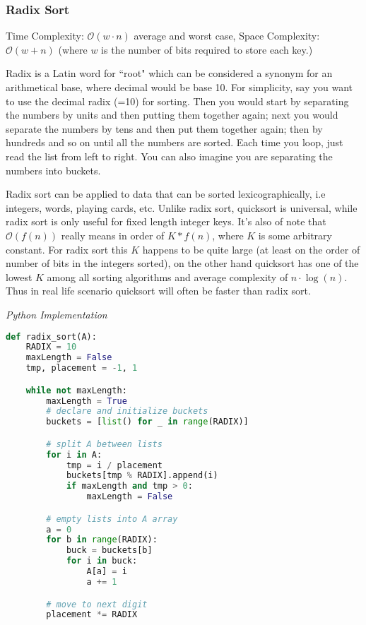 \documentclass{article}
\newcommand{\bigO}{\ensuremath{\mathcal{O}}}
\begin{document}
    \subsubsection{Radix Sort}
    Time Complexity: $\bigO(w \cdot n)$ average and worst case, Space Complexity: $\bigO(w + n)$ (where $w$ is the number of bits required to store each key.)
    
    Radix is a Latin word for ``root" which can be considered a synonym for an arithmetical base, where decimal would be base 10. For simplicity, say you want to use the decimal radix (=10) for sorting. Then you would start by separating the numbers by units and then putting them together again; next you would separate the numbers by tens and then put them together again; then by hundreds and so on until all the numbers are sorted. Each time you loop, just read the list from left to right. You can also imagine you are separating the numbers into buckets. 
    
    Radix sort can be applied to data that can be sorted lexicographically, i.e integers, words, playing cards, etc. Unlike radix sort, quicksort is universal, while radix sort is only useful for fixed length integer keys. It's also of note that $\bigO(f(n))$ really means in order of $K*f(n)$, where $K$ is some arbitrary constant. For radix sort this $K$ happens to be quite large (at least on the order of number of bits in the integers sorted), on the other hand quicksort has one of the lowest $K$ among all sorting algorithms and average complexity of $n \cdot \log(n)$. Thus in real life scenario quicksort will often be faster than radix sort.
    
\vspace{8pt} \emph{Python Implementation}
\begin{lstlisting}[language=Python]
def radix_sort(A):
    RADIX = 10
    maxLength = False
    tmp, placement = -1, 1

    while not maxLength:
        maxLength = True
        # declare and initialize buckets
        buckets = [list() for _ in range(RADIX)]

        # split A between lists
        for i in A:
            tmp = i / placement
            buckets[tmp % RADIX].append(i)
            if maxLength and tmp > 0:
                maxLength = False

        # empty lists into A array
        a = 0
        for b in range(RADIX):
            buck = buckets[b]
            for i in buck:
                A[a] = i
                a += 1

        # move to next digit
        placement *= RADIX
\end{lstlisting}
    
\end{document}
